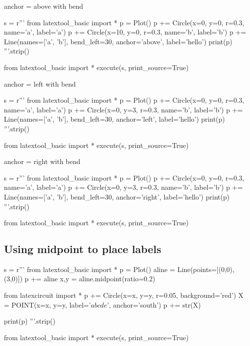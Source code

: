 anchor = above with bend
\begin{python}
s = r'''
from latextool_basic import *
p = Plot()
p += Circle(x=0, y=0, r=0.3, name='a', label='a')
p += Circle(x=10, y=0, r=0.3, name='b', label='b')
p += Line(names=['a', 'b'], bend_left=30, anchor='above', label='hello')
print(p)
'''.strip()

from latextool_basic import *
execute(s, print_source=True)
\end{python}



\newpage
anchor = left with bend
\begin{python}
s = r'''
from latextool_basic import *
p = Plot()
p += Circle(x=0, y=0, r=0.3, name='a', label='a')
p += Circle(x=0, y=3, r=0.3, name='b', label='b')
p += Line(names=['a', 'b'], bend_left=30, anchor='left', label='hello')
print(p)
'''.strip()

from latextool_basic import *
execute(s, print_source=True)
\end{python}

anchor = right with bend
\begin{python}
s = r'''
from latextool_basic import *
p = Plot()
p += Circle(x=0, y=0, r=0.3, name='a', label='a')
p += Circle(x=0, y=3, r=0.3, name='b', label='b')
p += Line(names=['a', 'b'], bend_left=30, anchor='right', label='hello')
print(p)
'''.strip()

from latextool_basic import *
execute(s, print_source=True)
\end{python}





\newpage
\subsection{Using midpoint to place labels}

\begin{python}
s = r'''
from latextool_basic import *
p = Plot()
aline = Line(points=[(0,0), (3,0)])
p += aline
x,y = aline.midpoint(ratio=0.2)

from latexcircuit import *
p += Circle(x=x, y=y, r=0.05, background='red')
X = POINT(x=x, y=y, label='$abcde$', anchor='south')
p += str(X)

print(p)
'''.strip()

from latextool_basic import *
execute(s, print_source=True)
\end{python}





